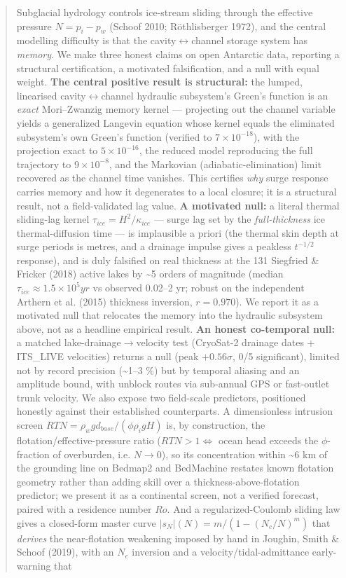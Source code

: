 \documentclass[11pt]{article}
\begin{document}
\begin{abstract}


Subglacial hydrology controls ice-stream sliding through the effective pressure $N=p_{i}-p_{w}$ (Schoof 2010; Röthlisberger 1972), and the central modelling difficulty is that the cavity\ensuremath{\leftrightarrow}channel storage system has \emph{memory}. We make three honest claims on open Antarctic data, reporting a structural certification, a motivated falsification, and a null with equal weight. \textbf{The central positive result is structural:} the lumped, linearised cavity\ensuremath{\leftrightarrow}channel hydraulic subsystem's Green's function is an \emph{exact} Mori–Zwanzig memory kernel — projecting out the channel variable yields a generalized Langevin equation whose kernel equals the eliminated subsystem's own Green's function (verified to $7\times 10^{-18}$), with the projection exact to $5\times 10^{-16}$, the reduced model reproducing the full trajectory to $9\times 10^{-8}$, and the Markovian (adiabatic-elimination) limit recovered as the channel time vanishes. This certifies \emph{why} surge response carries memory and how it degenerates to a local closure; it is a structural result, not a field-validated lag value. \textbf{A motivated null:} a literal thermal sliding-lag kernel $\tau _{ice}=H^{2}/\kappa _{ice}$ — surge lag set by the \emph{full-thickness} ice thermal-diffusion time — is implausible a priori (the thermal skin depth at surge periods is metres, and a drainage impulse gives a peakless $t^{-1/2}$ response), and is duly falsified on real thickness at the 131 Siegfried \& Fricker (2018) active lakes by \textasciitilde{}5 orders of magnitude (median $\tau _{ice}\approx 1.5\times 10^{5} yr$ vs observed 0.02–2 yr; robust on the independent Arthern et al. (2015) thickness inversion, $r=0.970$). We report it as a motivated null that relocates the memory into the hydraulic subsystem above, not as a headline empirical result. \textbf{An honest co-temporal null:} a matched lake-drainage\ensuremath{\to}velocity test (CryoSat-2 drainage dates + ITS\_LIVE velocities) returns a null (peak $+0.56\sigma $, 0/5 significant), limited not by record precision (\textasciitilde{}1–3 \%) but by temporal aliasing and an amplitude bound, with unblock routes via sub-annual GPS or fast-outlet trunk velocity. We also expose two field-scale predictors, positioned honestly against their established counterparts. A dimensionless intrusion screen $RTN=\rho _{w} g d_{base}/(\phi  \rho _{i} g H)$ is, by construction, the flotation/effective-pressure ratio ($RTN>1 \iff $ ocean head exceeds the $\phi $-fraction of overburden, i.e. $N\to 0$), so its concentration within \textasciitilde{}6 km of the grounding line on Bedmap2 and BedMachine restates known flotation geometry rather than adding skill over a thickness-above-flotation predictor; we present it as a continental screen, not a verified forecast, paired with a residence number $Ro$. And a regularized-Coulomb sliding law gives a closed-form master curve $|s_{N}|(N)=m/(1-(N_{c}/N)^{m})$ that \emph{derives} the near-flotation weakening imposed by hand in Joughin, Smith \& Schoof (2019), with an $N_{c}$ inversion and a velocity/tidal-admittance early-warning that 
\end{abstract}
\end{document}

